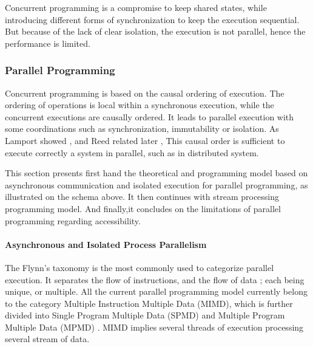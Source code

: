 Concurrent programming is a compromise to keep shared states, while introducing different forms of synchronization to keep the execution sequential.
But because of the lack of clear isolation, the execution is not parallel, hence the performance is limited.




\subsubsection{Parallel Programming} \label{chapter3:software-performance:parallel-programming}


Concurrent programming is based on the causal ordering of execution.
The ordering of operations is local within a synchronous execution, while the concurrent executions are causally ordered.
It leads to parallel execution with some coordinations such as synchronization, immutability or isolation.
As Lamport showed \cite{Lamport1978}, and Reed related later \cite{Reed2012}, This causal order is sufficient to execute correctly a system in parallel, such as in distributed system.

This section presents first hand the theoretical and programming model based on asynchronous communication and isolated execution for parallel programming, as illustrated on the schema above.
It then continues with stream processing programming model. 
And finally,it concludes on the limitations of parallel programming regarding accessibility. 




\paragraph{Asynchronous and Isolated Process Parallelism}

The Flynn's taxonomy \cite{Flynn1972} is the most commonly used to categorize parallel execution.
It separates the flow of instructions, and the flow of data ; each being unique, or multiple.
All the current parallel programming model currently belong to the category Multiple Instruction Multiple Data (MIMD), which is further divided into Single Program Multiple Data (SPMD) \cite{Auguin1983,Darema1988,Darema2001} and Multiple Program Multiple Data (MPMD) \cite{Chang1997,Chan2004}.
MIMD implies several threads of execution processing several stream of data.

